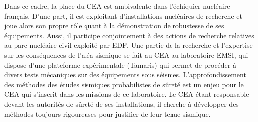 Dans ce cadre, la place du CEA est ambivalente dans l'échiquier nucléaire français.
D'une part, il est exploitant d'install\-ations nucléaires de recherche 
et joue alors son propre rôle quant à la démonstration de robustesse de ses équipements.
Aussi, il participe conjointement à des actions de recherche relatives au parc nucléaire civil exploité par EDF.
Une partie de la recherche et l'expertise sur les conséquences de l'aléa sismique %
se fait au CEA au laboratoire EMSI, qui dispose d'une plateforme expérimentale (Tamaris) qui permet de procéder à divers tests mécaniques sur des équipements sous séismes. 
L'approfondissement des méthodes des études sismiques probabilistes de sûreté est un enjeu pour le CEA qui s'inscrit dans les missions de ce laboratoire. Le CEA étant responsable devant les autorités de sûreté de ses installations, %
il cherche à développer des méthodes toujours rigoureuses pour justifier de leur tenue sismique.







